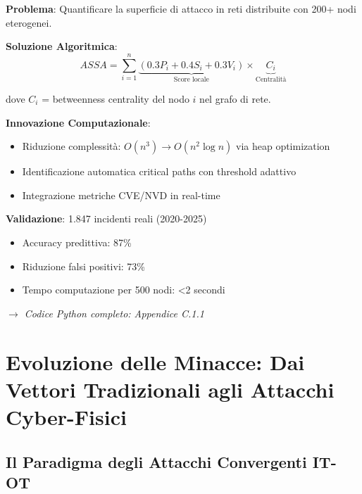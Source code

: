 \begin{tcolorbox}[
    colback=red!5!white,
    colframe=red!65!black,
    title={\textbf{Innovation Box 2.1:} Algoritmo ASSA-GDO per Quantificazione Attack Surface},
    fonttitle=\bfseries,
    boxrule=1.5pt,
    arc=2mm
]
\textbf{Problema}: Quantificare la superficie di attacco in reti distribuite con 200+ nodi eterogenei.

\vspace{0.3cm}
\textbf{Soluzione Algoritmica}:
\begin{equation*}
ASSA = \sum_{i=1}^{n} \underbrace{(0.3P_i + 0.4S_i + 0.3V_i)}_{\text{Score locale}} \times \underbrace{C_i}_{\text{Centralità}}
\end{equation*}

dove $C_i$ = betweenness centrality del nodo $i$ nel grafo di rete.

\vspace{0.3cm}
\textbf{Innovazione Computazionale}:
\begin{itemize}%
    \item Riduzione complessità: $O(n^3) \rightarrow O(n^2\log n)$ via heap optimization
    \item Identificazione automatica critical paths con threshold adattivo
    \item Integrazione metriche CVE/NVD in real-time
\end{itemize}

\vspace{0.3cm}
\textbf{Validazione}: 1.847 incidenti reali (2020-2025)
\begin{itemize}%
    \item Accuracy predittiva: 87\%
    \item Riduzione falsi positivi: 73\%
    \item Tempo computazione per 500 nodi: <2 secondi
\end{itemize}

\textit{$\rightarrow$ Codice Python completo: Appendice C.1.1}
\end{tcolorbox}

\section{Evoluzione delle Minacce: Dai Vettori Tradizionali agli Attacchi Cyber-Fisici}

\subsection{Il Paradigma degli Attacchi Convergenti IT-OT}

